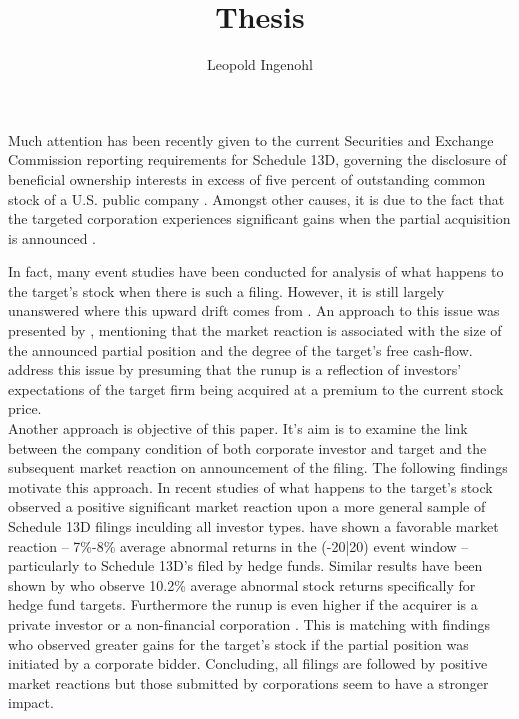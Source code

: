 \documentclass[12pt]{article}
\title{Thesis}
\author{Leopold Ingenohl}
\begin{document}
\maketitle

Much attention has been recently given to the current Securities and Exchange Commission reporting requirements for Schedule 13D, governing the disclosure of beneficial ownership interests in excess of five percent of outstanding common stock of a U.S. public company \citep{Giglia2018}. Amongst other causes, it is due to the fact that the targeted corporation experiences significant gains when the partial acquisition is announced \citep{Akhigbe2007}. %

In fact, many event studies have been conducted for analysis of what happens to the target's stock when there is such a filing. However, it is still largely unanswered where this upward drift comes from \citep{Greenwood2009}. An approach to this issue was presented by \citet{Akhigbe2007}, mentioning that the market reaction is associated with the size of the announced partial position and the degree of the target's free cash-flow.
\citet{Greenwood2009} address this issue by presuming that the runup is a reflection of investors' expectations of the target firm being acquired at a premium to the current stock price.\\ 
Another approach is objective of this paper. It's aim is to examine the link between the company condition of both corporate investor and target and the subsequent market reaction on announcement of the filing. %
The following findings motivate this approach.  
In recent studies of what happens to the target's stock  \citet{Collin-Dufresne2015} observed a positive significant market reaction upon a more general sample of Schedule 13D filings inculding all investor types. \citet{Brav2008} have shown a favorable market reaction -- 7\%-8\% average abnormal returns in the (-20|20) event window -- particularly to Schedule 13D's filed by hedge funds. Similar results have been shown by \citet{Klein2009} who observe 10.2\% average abnormal stock returns specifically for hedge fund targets. Furthermore the runup is even higher if the acquirer is a private investor or a non-financial corporation \citep{Brigida2012}. This is matching with \citet{Akhigbe2007} findings who observed greater gains for the target's stock if the partial position was initiated by a corporate bidder. Concluding, all filings are followed by positive market reactions but those submitted by corporations seem to have a stronger impact. 
\end{document}
